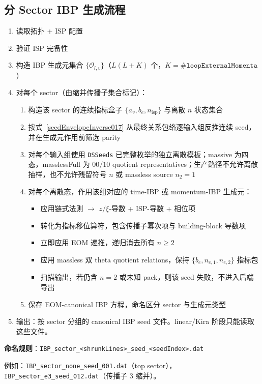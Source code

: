 ﻿\documentclass[a4paper,11pt]{article}
\begin{document}
\subsection{分 Sector IBP 生成流程}

\begin{enumerate}
  \item 读取拓扑 + ISP 配置
  \item 验证 ISP 完备性
  \item 构造 IBP 生成元集合 $\{\mathcal{O}_{l,v}\}$（$L(L+K)$ 个，$K=\#\texttt{loopExternalMomenta}$）
  \item 对每个 sector（由缩并传播子集合标记）：
  \begin{enumerate}
    \item 构造该 sector 的连续指标盒子 $\{a_v, b_e, n_{\text{isp}}\}$ 与离散 $n$ 状态集合
    \item 按式~\eqref{seedEnvelopeInverse017} 从最终关系包络逐输入组反推连续 seed，并在生成元作用前筛选 parity
    \item 对每个输入组使用 \texttt{DSSeeds} 已完整枚举的独立离散模板；massive 为四态，masslessFull 为 $00/10$ quotient representatives；生产路径不允许离散抽样，也不允许残留符号 $n$ 或 massless source $n_2=1$
    \item 对每个离散态，作用该组对应的 time-IBP 或 momentum-IBP 生成元：
      \begin{itemize}
        \item 应用链式法则 $\to$ $z/\xi$-导数 + ISP-导数 + 相位项
        \item 转化为指标移位算符，包含传播子幂次项与 building-block 导数项
        \item 立即应用 EOM 递推，递归消去所有 $n\geq 2$
        \item 应用 massless 双 theta quotient relations，保持 $\{b_e,n_{e,1},n_{e,2}\}$ 指标包
        \item 扫描输出，若仍含 $n=2$ 或未知 pack，则该 seed 失败，不进入后端导出
      \end{itemize}
    \item 保存 EOM-canonical IBP 方程，命名区分 sector 与生成元类型
  \end{enumerate}
  \item 输出：按 sector 分组的 canonical IBP seed 文件。linear/Kira 阶段只能读取这些文件。
\end{enumerate}

\textbf{命名规则}：\texttt{IBP\_sector\_<shrunkLines>\_seed\_<seedIndex>.dat}

例如：\texttt{IBP\_sector\_none\_seed\_001.dat}（top sector），\texttt{IBP\_sector\_e3\_seed\_012.dat}（传播子 3 缩并）。
\end{document}
